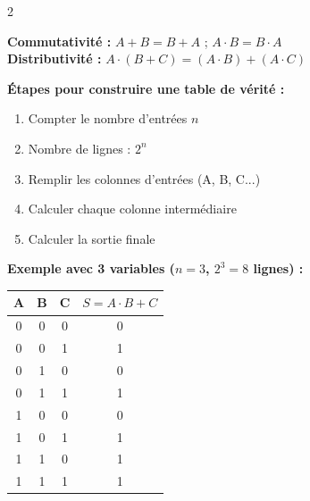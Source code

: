 \documentclass[a4paper,10pt]{article}
\begin{document}
\begin{multicols}{2}
\begin{tcolorbox}[basebox, colframe=purple, title=4. Algèbre Booléenne — Propriétés et lois]
\textbf{Commutativité :}
$A+B = B+A$ \quad; \quad $A \cdot B = B \cdot A$\\[4pt]
\textbf{Distributivité :}
$A \cdot (B+C) = (A \cdot B) + (A \cdot C)$
\end{tcolorbox}

\begin{tcolorbox}[basebox, colframe=teal, title=5. Tables de vérité — Méthode]
\textbf{Étapes pour construire une table de vérité :}
\begin{enumerate}
  \item Compter le nombre d'entrées $n$
  \item Nombre de lignes : $2^n$
  \item Remplir les colonnes d'entrées (A, B, C...)
  \item Calculer chaque colonne intermédiaire
  \item Calculer la sortie finale
\end{enumerate}
\vspace{4pt}
\textbf{Exemple avec 3 variables ($n=3$, $2^3=8$ lignes) :}
\begin{center}
\begin{tabular}{ccc|c}
A & B & C & $S = A \cdot B + C$ \\
\hline
0 & 0 & 0 & 0 \\
0 & 0 & 1 & 1 \\
0 & 1 & 0 & 0 \\
0 & 1 & 1 & 1 \\
1 & 0 & 0 & 0 \\
1 & 0 & 1 & 1 \\
1 & 1 & 0 & 1 \\
1 & 1 & 1 & 1 \\
\end{tabular}
\end{center}
\end{tcolorbox}


\end{multicols}
\end{document}
